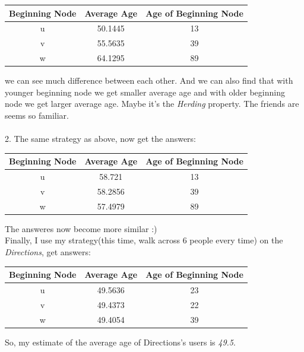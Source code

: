 \documentclass[11pt]{article} %
\begin{document}
\begin{table}[!hbp]
\centering
\begin{tabular}{|c|c|c|}
\hline
Beginning Node & Average Age & Age of Beginning Node \\
\hline
u & 50.1445 & 13\\
\hline
v & 55.5635 & 39 \\
\hline
w & 64.1295 & 89 \\
\hline
\end{tabular}
\end{table}

we can see much difference between each other. And we can also find that with younger beginning node we get smaller average age and with older beginning node we get larger average age. Maybe it's the \emph{Herding} property. The friends are seems so familiar.\\
\\
2. The same strategy as above, now get the answers:\\

\begin{table}[!hbp]
\centering
\begin{tabular}{|c|c|c|}
\hline
Beginning Node & Average Age & Age of Beginning Node \\
\hline
u & 58.721 & 13\\
\hline
v & 58.2856 & 39 \\
\hline
w & 57.4979 & 89 \\
\hline
\end{tabular}
\end{table}

The answeres now become more similar :) \\


Finally, I use my strategy(this time, walk across 6 people every time) on the \emph{Directions}, get answers:\\

\begin{table}[!hbp]
\centering
\begin{tabular}{|c|c|c|}
\hline
Beginning Node & Average Age & Age of Beginning Node \\
\hline
u & 49.5636 & 23\\
\hline
v & 49.4373 & 22 \\
\hline
w & 49.4054 & 39 \\
\hline
\end{tabular}
\end{table}

So, my estimate of the average age of Directions's users is \emph{49.5}.
\end{document}

